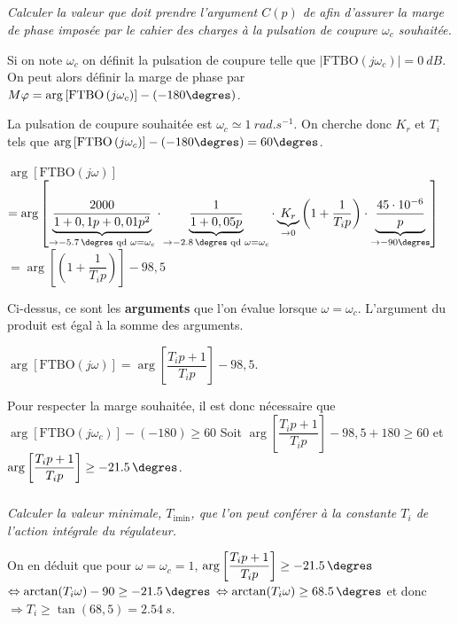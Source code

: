 \documentclass[10pt,fleqn]{article} %
\begin{document}
\begin{multicols}{2}
\subparagraph{}\textit{Calculer la valeur que doit prendre l’argument $C(p)$ de afin d’assurer
la marge de phase imposée par le cahier des charges à la pulsation de coupure $\omega_c$
souhaitée.}

\footnotesize
\begin{methode}
Si on note $\omega_c$ on définit la pulsation de coupure telle que $|\text{FTBO}\left(j \omega_c \right)| = \SI{0}{dB}$. On peut alors définir la marge de phase par $M\varphi=\arg \left[\text{FTBO}\left( j \omega_c\right)\right]-\left(-180\degres\right)$.
\end{methode}

\normalsize 

\ifprof
\begin{corrige}
La pulsation de coupure souhaitée est $\omega_c \simeq \SI{1}{rad.s^{-1}}$. 
On cherche donc $K_r$ et $T_i$ tels que $\arg \left[\text{FTBO}\left( j \omega_c\right)\right]-\left(-180\degres\right)=60\degres$.

$\arg \left[\text{FTBO}\left( j \omega\right)\right]$ 
$ = \arg \left[
\underbrace{\dfrac{2000}{1+0,1p+0,01p^2}}_{\to \SI{-5,7}{\degres} \text{ qd } \omega=\omega_c} 
\cdot
\underbrace{\dfrac{1}{1+0,05p}}_{\to \SI{-2,8}{\degres} \text{ qd } \omega=\omega_c} 
\cdot 
 \underbrace{K_r}_{\to 0}
 \left(1+\dfrac{1}{T_i p} \right) \cdot 
\underbrace{\dfrac{45\cdot 10^{-6}}{p}}_{\to -90\degres } 
\right] $
$ = \arg \left[  \left(1+\dfrac{1}{T_i p} \right) \right] -98,5$

\begin{rem}
Ci-dessus, ce sont les \textbf{arguments} que l'on évalue lorsque $\omega=\omega_c$. L'argument du produit est égal à la somme des arguments.
\end{rem}
$ \arg \left[\text{FTBO}\left( j \omega\right)\right] = \arg \left[  \dfrac{T_i p+1}{T_i p}  \right]-98,5 $.

Pour respecter la marge souhaitée, il est donc nécessaire que 
$\arg \left[\text{FTBO}\left( j \omega_c\right)\right]-\left(-180\right)\geq60$
Soit 
$\arg \left[  \dfrac{T_i p+1}{T_i p}  \right]-98,5+ 180 \geq60$ 
et $\arg \left[  \dfrac{T_i p+1}{T_i p}  \right] \geq - \SI{21,5}{\degres}$.
 
\end{corrige}
\else
\fi

\subparagraph{}\textit{Calculer la valeur minimale, $T_{\text{imin}}$, que l’on peut conférer à la constante $T_i$ de l’action intégrale du régulateur.}

\ifprof
\begin{corrige}
On en déduit que pour $\omega=\omega_c=1$, 
$\arg \left[  \dfrac{T_i p+1}{T_i p}  \right] \geq - \SI{21,5}{\degres}$
$ \Leftrightarrow  \arctan (T_i \omega) -90 \geq - \SI{21,5}{\degres}$ 
$ \Leftrightarrow  \arctan (T_i \omega)  \geq \SI{68,5}{\degres}$ 
et donc $\Rightarrow  T_i \geq \tan(68,5)=\SI{2,54}{s}$.
 


\end{corrige}
\end{multicols}
\end{document}
